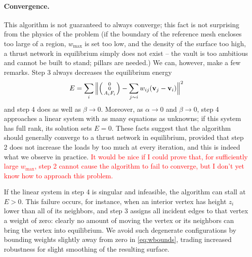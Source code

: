 \documentclass[annual]{acmsiggraph}
\makeatletter
\def\Forcevector{\Big(\mbox{\scriptsize
	\def\arraystretch{0.8}\begin{tabular}{@{\,}c@{\,}}
	0 \\ 0 \\ $A_i F_i$
	\end{tabular}}\Big)}
\newcommand{\todo}[1]{\textcolor{red}{#1}}
\makeatother
\begin{document}
\paragraph{Convergence.}
This algorithm is not guaranteed to always converge; this fact is not surprising from the physics of the problem (if the boundary of the reference mesh encloses too large of a region, $w_{\max}$ is set too low, and the density of the surface too high, a thrust network in equilibrium simply does not exist -- the vault is too ambitious and cannot be built to stand; pillars are needed.) We can, however, make a few remarks. Step 3 always decreases the equilibrium energy
	$$E=\sum_i \Big\| \Forcevector 
		- \sum_{j\sim i} w_{ij} (\vw_j - \vw_i)\Big\|^2$$
and step 4 does as well as $\beta \to 0$. Moreover, as $\alpha \to 0$ and $\beta \to 0$, step 4 approaches a linear system with as many equations as unknowns; if this system has full rank, its solution sets $E=0$. These facts suggest that the algorithm should generally converge to a thrust network in equilibrium, provided that step 2 does not increase the loads by too much at every iteration, and this is indeed what we observe in practice.  \todo{It would be nice if I could prove that, for sufficiently large $w_{\textrm{max}}$, step 2 cannot cause the algorithm to fail to converge, but I don't yet know how to approach this problem.}

If the linear system in step 4 is singular and infeasible, the algorithm can stall at $E > 0$. This failure occurs, for instance, when an interior vertex has height $z_i$ lower than all of its neighbors, and step 3 assigns all incident edges to that vertex a weight of zero: clearly no amount of moving the vertex or its neighbors can bring the vertex into equilibrium. We avoid such degenerate configurations by bounding weights slightly away from zero in \eqref{eq:wbounds}, trading increased robustness for slight smoothing of the resulting surface.
\end{document}
